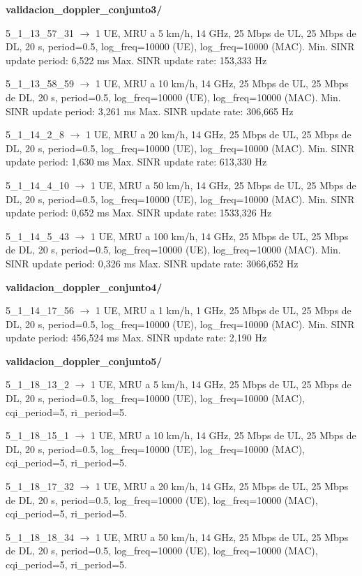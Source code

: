 \documentclass[12pt]{report} %
\begin{document}
\textbf{validacion\_doppler\_conjunto3/}

5\_1\_13\_57\_31 $\rightarrow$ 1 UE, MRU a 5 km/h, 14 GHz, 25 Mbps de UL,  25 Mbps de DL, 20 s, period=0.5, log\_freq=10000 (UE), log\_freq=10000 (MAC).
Min. SINR update period: 6,522 ms
Max. SINR update rate: 153,333 Hz

5\_1\_13\_58\_59 $\rightarrow$ 1 UE, MRU a 10 km/h, 14 GHz, 25 Mbps de UL,  25 Mbps de DL, 20 s, period=0.5, log\_freq=10000 (UE), log\_freq=10000 (MAC).
Min. SINR update period: 3,261 ms
Max. SINR update rate: 306,665 Hz

5\_1\_14\_2\_8 $\rightarrow$ 1 UE, MRU a 20 km/h, 14 GHz, 25 Mbps de UL,  25 Mbps de DL, 20 s, period=0.5, log\_freq=10000 (UE), log\_freq=10000 (MAC).
Min. SINR update period: 1,630 ms
Max. SINR update rate: 613,330 Hz

5\_1\_14\_4\_10 $\rightarrow$ 1 UE, MRU a 50 km/h, 14 GHz, 25 Mbps de UL,  25 Mbps de DL, 20 s, period=0.5, log\_freq=10000 (UE), log\_freq=10000 (MAC).
Min. SINR update period: 0,652 ms
Max. SINR update rate: 1533,326 Hz

5\_1\_14\_5\_43 $\rightarrow$ 1 UE, MRU a 100 km/h, 14 GHz, 25 Mbps de UL,  25 Mbps de DL, 20 s, period=0.5, log\_freq=10000 (UE), log\_freq=10000 (MAC).
Min. SINR update period: 0,326 ms
Max. SINR update rate: 3066,652 Hz

\textbf{validacion\_doppler\_conjunto4/}

5\_1\_14\_17\_56 $\rightarrow$ 1 UE, MRU a 1 km/h, 1 GHz, 25 Mbps de UL,  25 Mbps de DL, 20 s, period=0.5, log\_freq=10000 (UE), log\_freq=10000 (MAC).
Min. SINR update period: 456,524 ms
Max. SINR update rate: 2,190 Hz

\textbf{validacion\_doppler\_conjunto5/}

5\_1\_18\_13\_2 $\rightarrow$ 1 UE, MRU a 5 km/h, 14 GHz, 25 Mbps de UL,  25 Mbps de DL, 20 s, period=0.5, log\_freq=10000 (UE), log\_freq=10000 (MAC), cqi\_period=5, ri\_period=5.

5\_1\_18\_15\_1 $\rightarrow$ 1 UE, MRU a 10 km/h, 14 GHz, 25 Mbps de UL,  25 Mbps de DL, 20 s, period=0.5, log\_freq=10000 (UE), log\_freq=10000 (MAC), cqi\_period=5, ri\_period=5.

5\_1\_18\_17\_32 $\rightarrow$ 1 UE, MRU a 20 km/h, 14 GHz, 25 Mbps de UL,  25 Mbps de DL, 20 s, period=0.5, log\_freq=10000 (UE), log\_freq=10000 (MAC), cqi\_period=5, ri\_period=5.

5\_1\_18\_18\_34 $\rightarrow$ 1 UE, MRU a 50 km/h, 14 GHz, 25 Mbps de UL,  25 Mbps de DL, 20 s, period=0.5, log\_freq=10000 (UE), log\_freq=10000 (MAC), cqi\_period=5, ri\_period=5.
\end{document}
